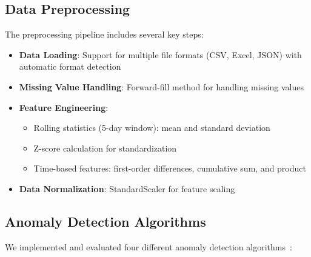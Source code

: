 \documentclass[conference]{IEEEtran}
\begin{document}
\subsection{Data Preprocessing}
The preprocessing pipeline includes several key steps:
\begin{itemize}
    \item \textbf{Data Loading}: Support for multiple file formats (CSV, Excel, JSON) with automatic format detection
    \item \textbf{Missing Value Handling}: Forward-fill method for handling missing values
    \item \textbf{Feature Engineering}:
    \begin{itemize}
        \item Rolling statistics (5-day window): mean and standard deviation
        \item Z-score calculation for standardization
        \item Time-based features: first-order differences, cumulative sum, and product
    \end{itemize}
    \item \textbf{Data Normalization}: StandardScaler for feature scaling
\end{itemize}

\subsection{Anomaly Detection Algorithms}
We implemented and evaluated four different anomaly detection algorithms~\cite{wang2024, li2024}:
\end{document}

